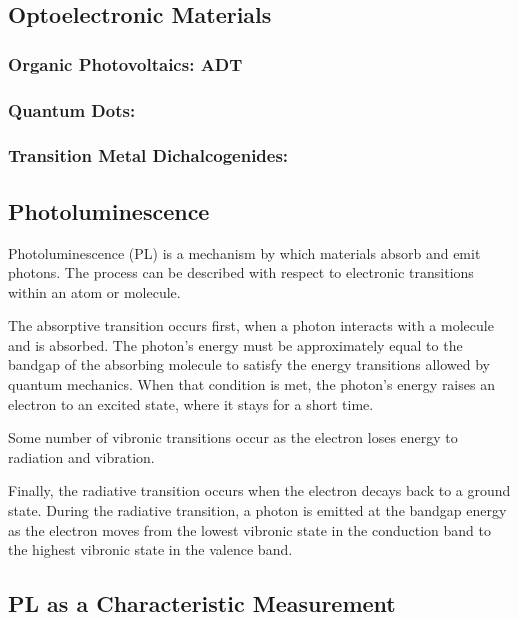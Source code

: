 \subsection{Optoelectronic Materials}
\subsubsection{Organic Photovoltaics: ADT}
\subsubsection{Quantum Dots: }
\subsubsection{Transition Metal Dichalcogenides: }

\subsection{Photoluminescence}
Photoluminescence (PL) is a mechanism by which materials absorb and emit photons. The process can be described with respect to electronic transitions within an atom or molecule.

The absorptive transition occurs first, when a photon interacts with a molecule and is absorbed. The photon's energy must be approximately equal to the bandgap of the absorbing molecule to satisfy the energy transitions allowed by quantum mechanics. When that condition is met, the photon's energy raises an electron to an excited state, where it stays for a short time.

Some number of vibronic transitions occur as the electron loses energy to radiation and vibration. 

Finally, the radiative transition occurs when the electron decays back to a ground state. During the radiative transition, a photon is emitted at the bandgap energy as the electron moves from the lowest vibronic state in the conduction band to the highest vibronic state in the valence band. 

\subsection{PL as a Characteristic Measurement}

